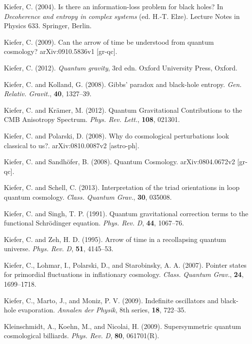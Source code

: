 \documentclass[12pt,a4paper]{article}
\begin{document}
\bibitem{} Kiefer, C. (2004). Is there an information-loss problem
           for black holes? In {\em Decoherence and
           entropy in complex systems} (ed. H.-T. Elze). 
           Lecture Notes in Physics 633. Spring\-er, Berlin.

\bibitem{} Kiefer, C. (2009). Can the arrow of time be understood from
quantum cosmology? arXiv:0910.5836v1 [gr-qc].

\bibitem{} Kiefer, C. (2012). {\em Quantum gravity}, 3rd edn. Oxford
  University Press, Oxford.

\bibitem{} Kiefer, C. and Kolland, G. (2008). 
           Gibbs' paradox and black-hole entropy.
           {\em Gen. Relativ. Gravit.}, {\bf 40}, 1327--39.

\bibitem{} Kiefer, C. and Kr\"amer, M. (2012).
Quantum Gravitational Contributions to the CMB Anisotropy Spectrum.
 {\em Phys. Rev. Lett.}, {\bf 108}, 021301.

\bibitem{} Kiefer, C. and Polarski, D. (2008).
Why do cosmological perturbations look classical to us?.
 arXiv:0810.0087v2 [astro-ph].

\bibitem{} Kiefer, C. and Sandh\"ofer, B. (2008). Quantum Cosmology.
            arXiv:0804.0672v2 [gr-qc]. 

\bibitem{} Kiefer, C. and Schell, C. (2013). Interpretation of the
  triad orientations in loop quantum cosmology. {\em Class. Quantum
    Grav.}, {\bf 30}, 035008.

\bibitem{} Kiefer, C. and Singh, T. P. (1991). Quantum gravitational
           correction terms to the functional Schr\"odinger equation.
           {\em Phys. Rev. D}, {\bf 44}, 1067--76.

\bibitem{} Kiefer, C. and Zeh, H. D. (1995). Arrow of time in a recollapsing
           quantum universe. {\em Phys. Rev. D}, {\bf 51}, 4145--53.

\bibitem{} Kiefer, C., Lohmar, I., Polarski, D., and Starobinsky,
A. A. (2007). Pointer states for primordial fluctuations in
inflationary cosmology. {\em Class. Quantum Grav.}, {\bf 24}, 1699--1718.

\bibitem{} Kiefer, C., Marto, J., and Moniz, P. V. (2009).
           Indefinite oscillators and black-hole evaporation.
           {\em Annalen der Physik}, 8th series, {\bf 18}, 722--35.

\bibitem{} Kleinschmidt, A., Koehn, M., and Nicolai, H. (2009).
           Supersymmetric quantum cosmological billiards.
           {\em Phys. Rev. D}, {\bf 80}, 061701(R).
\end{document}
